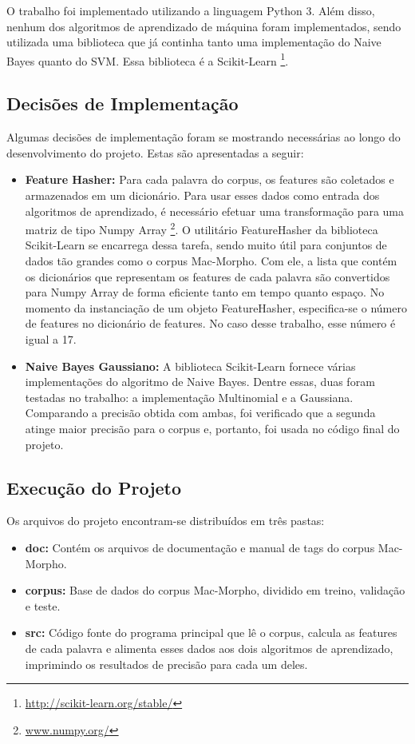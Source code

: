 \documentclass[12pt]{article}
\begin{document}
O trabalho foi implementado utilizando a linguagem Python 3. Além disso, nenhum
dos algoritmos de aprendizado de máquina foram implementados, sendo utilizada
uma biblioteca que já continha tanto uma implementação do Naive Bayes quanto do
SVM. Essa biblioteca é a Scikit-Learn
\footnote{\url{http://scikit-learn.org/stable/}}.

\subsection{Decisões de Implementação}

Algumas decisões de implementação foram se mostrando necessárias ao longo do 
desenvolvimento do projeto. Estas são apresentadas a seguir:

\begin{itemize}
	\item \textbf{Feature Hasher:} Para cada palavra do corpus, os features são
	coletados e armazenados em um dicionário. Para usar esses dados como entrada
	dos algoritmos de aprendizado, é necessário efetuar uma transformação para
	uma matriz de tipo Numpy Array \footnote{\url{www.numpy.org/}}. O utilitário 
	FeatureHasher da biblioteca Scikit-Learn se encarrega dessa tarefa, sendo
	muito útil para conjuntos de dados tão grandes como o corpus Mac-Morpho.
	Com ele, a lista que contém os dicionários que representam os features
	de cada palavra são convertidos para Numpy Array de forma eficiente tanto
	em tempo quanto espaço. No momento da instanciação de um objeto FeatureHasher,
	especifica-se o número de features no dicionário de features. No caso desse
	trabalho, esse número é igual a 17.

	\item \textbf{Naive Bayes Gaussiano:} A biblioteca Scikit-Learn fornece várias
	implementações do algoritmo de Naive Bayes. Dentre essas, duas foram testadas
	no trabalho: a implementação Multinomial e a Gaussiana. Comparando a precisão
	obtida com ambas, foi verificado que a segunda atinge maior precisão para o 
	corpus e, portanto, foi usada no código final do projeto.
\end{itemize}

\subsection{Execução do Projeto}

Os arquivos do projeto encontram-se distribuídos em três pastas:

\begin{itemize}
	\item \textbf{doc:} Contém os arquivos de documentação e manual de tags 
	do corpus Mac-Morpho.

	\item \textbf{corpus:} Base de dados do corpus Mac-Morpho, dividido em treino,
	validação e teste.

	\item \textbf{src:} Código fonte do programa principal que lê o corpus, 
	calcula as features de cada palavra e alimenta esses dados aos dois
	algoritmos de aprendizado, imprimindo os resultados de precisão para cada um
	deles.
\end{itemize}
\end{document}
